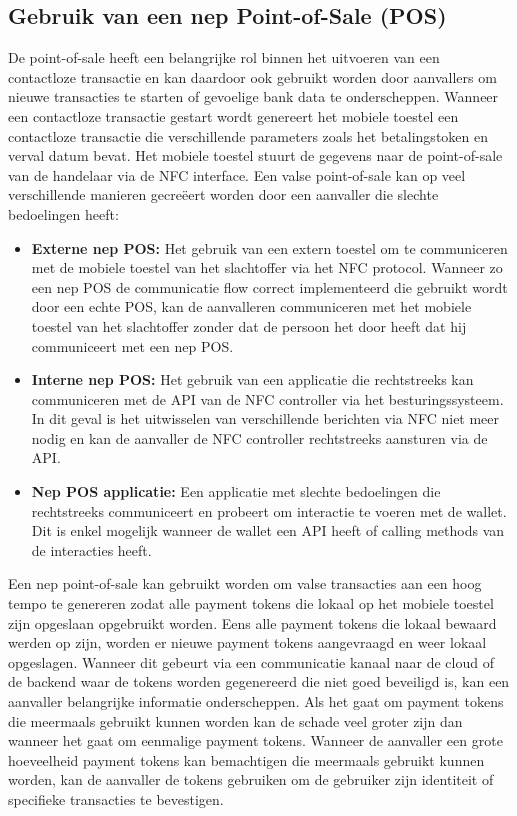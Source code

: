 \subsection{Gebruik van een nep Point-of-Sale (POS)}
De point-of-sale heeft een belangrijke rol binnen het uitvoeren van een contactloze transactie en kan daardoor ook gebruikt worden door aanvallers om nieuwe transacties te starten of gevoelige bank data te onderscheppen. Wanneer een contactloze transactie gestart wordt genereert het mobiele toestel een contactloze transactie die verschillende parameters zoals het betalingstoken en verval datum bevat. Het mobiele toestel stuurt de gegevens naar de point-of-sale van de handelaar via de NFC interface. Een valse point-of-sale kan op veel verschillende manieren gecreëert worden door een aanvaller die slechte bedoelingen heeft:

\begin{itemize}
	\item \textbf{Externe nep POS:} Het gebruik van een extern toestel om te communiceren met de mobiele toestel van het slachtoffer via het NFC protocol. Wanneer zo een nep POS de communicatie flow correct implementeerd die gebruikt wordt door een echte POS, kan de aanvalleren communiceren met het mobiele toestel van het slachtoffer zonder dat de persoon het door heeft dat hij communiceert met een nep POS.
	
	\item \textbf{Interne nep POS:} Het gebruik van een applicatie die rechtstreeks kan communiceren met de API van de NFC controller via het besturingssysteem. In dit geval is het uitwisselen van verschillende berichten via NFC niet meer nodig en kan de aanvaller de NFC controller rechtstreeks aansturen via de API.
	
	\item \textbf{Nep POS applicatie:} Een applicatie met slechte bedoelingen die rechtstreeks communiceert en probeert om interactie te voeren met de wallet. Dit is enkel mogelijk wanneer de wallet een API heeft of calling methods van de interacties heeft.
\end{itemize}

Een nep point-of-sale kan gebruikt worden om valse transacties aan een hoog tempo te genereren zodat alle payment tokens die lokaal op het mobiele toestel zijn opgeslaan opgebruikt worden. Eens alle payment tokens die lokaal bewaard werden op zijn, worden er nieuwe payment tokens aangevraagd en weer lokaal opgeslagen. Wanneer dit gebeurt via een communicatie kanaal naar de cloud of de backend waar de tokens worden gegenereerd die niet goed beveiligd is, kan een aanvaller belangrijke informatie onderscheppen. Als het gaat om payment tokens die meermaals gebruikt kunnen worden kan de schade veel groter zijn dan wanneer het gaat om eenmalige payment tokens. Wanneer de aanvaller een grote hoeveelheid payment tokens kan bemachtigen die meermaals gebruikt kunnen worden, kan de aanvaller de tokens gebruiken om de gebruiker zijn identiteit of specifieke transacties te bevestigen.

